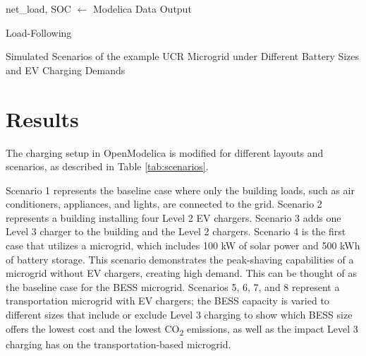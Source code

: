 \documentclass[conference,  usletter]{IEEEtran}
\begin{document}
\begin{algorithm}
net\_load, SOC $\gets$ Modelica Data Output \\
\caption{Load-Following}
\label{alg:peakshavingflatrate}
\end{algorithm}
\begin{table}
\caption{Simulated Scenarios of the example UCR Microgrid under Different Battery Sizes and EV Charging Demands}

\normalsize
\label{tab:scenarios}
\end{table}
\section{Results}
The charging setup in OpenModelica is modified for different layouts and scenarios, as described in Table \ref{tab:scenarios}.

Scenario 1 represents the baseline case where only the building loads, such as air conditioners, appliances, and lights, are connected to the grid. Scenario 2 represents a building installing four Level 2 EV chargers. Scenario 3 adds one Level 3 charger to the building and the Level 2 chargers. Scenario 4 is the first case that utilizes a microgrid, which includes 100 kW of solar power and 500 kWh of battery storage. This scenario demonstrates the peak-shaving capabilities of a microgrid without EV chargers, creating high demand. This can be thought of as the baseline case for the BESS microgrid. Scenarios 5, 6, 7, and 8 represent a transportation microgrid with EV chargers; the BESS capacity is varied to different sizes that include or exclude Level 3 charging to show which BESS size offers the lowest cost and the lowest CO\textsubscript{2} emissions, as well as the impact Level 3 charging has on the transportation-based microgrid.
\end{document}
